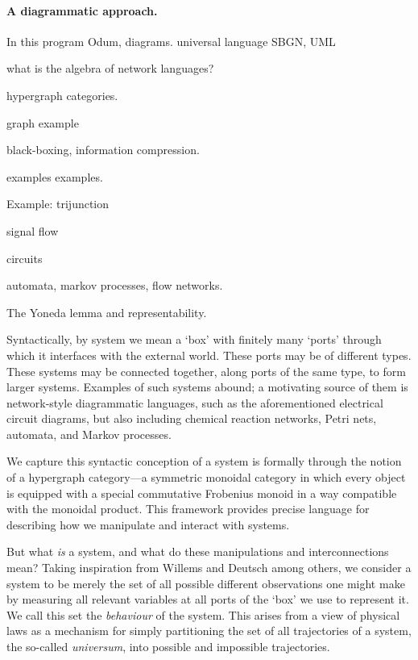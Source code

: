 \paragraph{A diagrammatic approach.}

In this program Odum, diagrams. universal language SBGN, UML

what is the algebra of network languages?

hypergraph categories.

graph example

black-boxing, information compression.

examples examples.

Example: trijunction

signal flow

circuits

automata, markov processes, flow networks.

The Yoneda lemma and representability.


Syntactically, by system we mean a `box' with finitely many `ports' through which it
interfaces with the external world. These ports may be of different types. These
systems may be connected together, along ports of the same type, to form larger
systems. Examples of such systems abound; a motivating source of them is
network-style diagrammatic languages, such as the aforementioned electrical
circuit diagrams, but also including chemical reaction networks, Petri nets,
automata, and Markov processes.

We capture this syntactic conception of a system is formally through the notion
of a hypergraph category---a symmetric monoidal category in which every object
is equipped with a special commutative Frobenius monoid in a way compatible with
the monoidal product. This framework provides precise language for describing
how we manipulate and interact with systems.


But what \emph{is} a system, and what do these manipulations and
interconnections mean? Taking inspiration from Willems \cite{Wi} and Deutsch
\cite{D} among others, we consider a system to be merely the set of all possible
different observations one might make by measuring all relevant variables at all
ports of the `box' we use to represent it.  We call this set the
\emph{behaviour} of the system. This arises from a view of physical laws as a
mechanism for simply partitioning the set of all trajectories of a system, the
so-called \emph{universum}, into possible and impossible trajectories.

